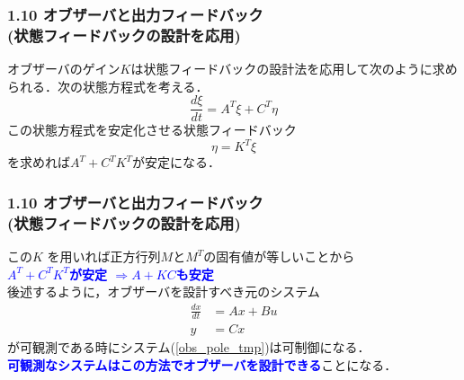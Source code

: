 \documentclass[10pt]{beamer}
\begin{document}
\begin{frame}[t]
\frametitle{1.10 オブザーバと出力フィードバック \\
(状態フィードバックの設計を応用)}
オブザーバのゲイン$K$は状態フィードバックの設計法を応用して次のように求められる．次の状態方程式を考える．
\begin{equation}
 \frac{d \xi}{dt} = A^T \xi + C^T \eta

\end{equation}
この状態方程式を安定化させる状態フィードバック
\begin{equation}
 \eta =  K^T \xi
\end{equation}
を求めれば$A^T + C^T K^T$が安定になる．\\
\end{frame}


\begin{frame}[t]
\frametitle{1.10 オブザーバと出力フィードバック \\
(状態フィードバックの設計を応用)}
この$K$ を用いれば正方行列$M$と$M^T$の固有値が等しいことから
\\
 \textcolor{blue}{\bf $A^T + C^T K^T$が安定 $\Longrightarrow$$ A + K C$も安定}\\
後述するように，オブザーバを設計すべき元のシステム
\begin{align}
 \frac{dx}{dt} &= A x + B u  \\
 y             &= C x 
\end{align}
が可観測である時にシステム(\ref{obs_pole_tmp})は可制御になる．\\
\textcolor{blue}{\bf 可観測なシステムはこの方法でオブザーバを設計できる}ことになる．
\end{frame}
\end{document}
